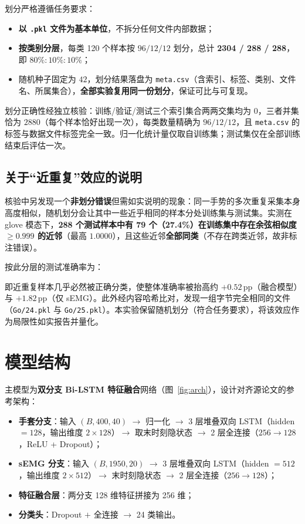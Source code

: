 \documentclass[11pt,a4paper]{ctexart}
\begin{document}
划分严格遵循任务要求：

\begin{itemize}[leftmargin=2em]
\item \textbf{以 \texttt{.pkl} 文件为基本单位}，不拆分任何文件内部数据；
\item \textbf{按类别分层}，每类 120 个样本按 $96/12/12$ 划分，总计 \textbf{2304 / 288 / 288}，即 $80\%:10\%:10\%$；
\item 随机种子固定为 $42$，划分结果落盘为 \texttt{meta.csv}（含索引、标签、类别、文件名、所属集合），\textbf{全部实验复用同一份划分}，保证可比与可复现。
\end{itemize}

划分正确性经独立核验：训练/验证/测试三个索引集合两两交集均为 $0$，三者并集恰为 $2880$（每个样本恰好出现一次），每类数量精确为 $96/12/12$，且 \texttt{meta.csv} 的标签与数据文件标签完全一致。归一化统计量仅取自训练集；测试集仅在全部训练结束后评估一次。

\subsection{关于“近重复”效应的说明}

核验中另发现一个\textbf{非划分错误}但需如实说明的现象：同一手势的多次重复采集本身高度相似，随机划分会让其中一些近乎相同的样本分处训练集与测试集。实测在 glove 模态下，\textbf{288 个测试样本中有 79 个（27.4\%）在训练集中存在余弦相似度 $\ge0.999$ 的近邻}（最高 $1.0000$），且这些近邻\textbf{全部同类}（不存在跨类近邻，故非标注错误）。

按此分层的测试准确率为：



即近重复样本几乎必然被正确分类，使整体准确率被抬高约 $+0.52$\,pp（融合模型）与 $+1.82$\,pp（仅 sEMG）。此外经内容哈希比对，发现一组字节完全相同的文件（\texttt{Go/24.pkl} 与 \texttt{Go/25.pkl}）。本实验保留随机划分（符合任务要求），将该效应作为局限性如实报告并量化。

\section{模型结构}

主模型为\textbf{双分支 Bi-LSTM 特征融合}网络（图~\ref{fig:arch}），设计对齐源论文的参考架构：

\begin{itemize}[leftmargin=2em]
\item \textbf{手套分支}：输入 $(B,400,40)$ $\rightarrow$ 归一化 $\rightarrow$ 3 层堆叠双向 LSTM（hidden $=128$，输出维度 $2\times128$）$\rightarrow$ 取末时刻隐状态 $\rightarrow$ 2 层全连接（$256\rightarrow128$，ReLU + Dropout）；
\item \textbf{sEMG 分支}：输入 $(B,1950,20)$ $\rightarrow$ 3 层堆叠双向 LSTM（hidden $=512$，输出维度 $2\times512$）$\rightarrow$ 末时刻隐状态 $\rightarrow$ 2 层全连接（$256\rightarrow128$）；
\item \textbf{特征融合层}：两分支 128 维特征拼接为 256 维；
\item \textbf{分类头}：Dropout $+$ 全连接 $\rightarrow$ 24 类输出。
\end{itemize}
\end{document}
